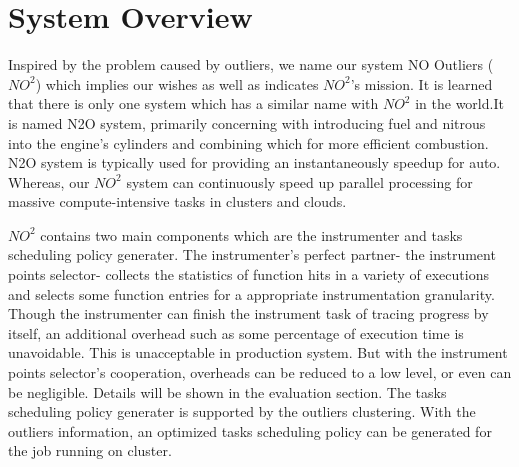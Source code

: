 \section{System Overview}

Inspired by the problem caused by outliers, we name our system NO Outliers ($NO^2$) which implies our
wishes as well as indicates $NO^2$'s mission. It is learned that there is only one system which has a
similar name with $NO^2$ in the world.It is named N2O system, primarily concerning with
introducing fuel and nitrous into the engine's cylinders and combining which for more
efficient combustion. N2O system is typically used for providing an instantaneously speedup for auto.
Whereas, our $NO^2$ system can continuously speed up parallel processing for massive
compute-intensive tasks in clusters and clouds.

$NO^2$ contains two main components which are the instrumenter and tasks scheduling policy
generater. The instrumenter's perfect partner- the instrument points selector- 
collects the statistics of function hits in a variety of executions and selects some
function entries for a appropriate instrumentation granularity. Though the instrumenter
can finish the instrument task of tracing progress by itself, an additional overhead such
as some percentage of execution time is unavoidable. This is unacceptable in
production system. But with the instrument points selector's cooperation, overheads can be
reduced to a low level, or even can be negligible. Details will be shown in the evaluation section. The
tasks scheduling policy generater is supported by the outliers clustering. With the
outliers information, an optimized tasks scheduling policy can be generated for the job
running on cluster.

